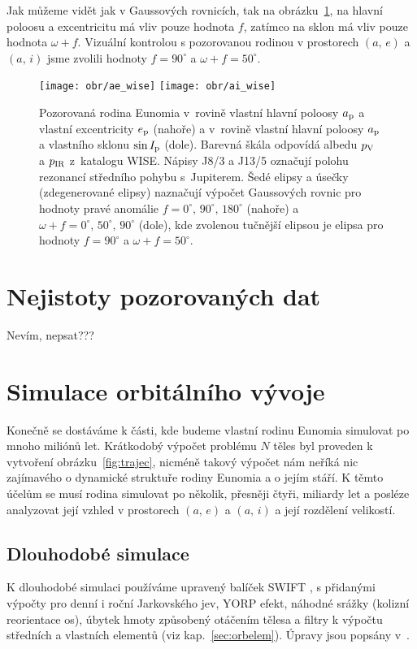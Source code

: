 \documentclass[A4paper, 12pt, oneside]{book}
\begin{document}
Jak můžeme vidět jak v Gaussových rovnicích, tak na obrázku~\ref{fig:ae_ai_wise}, na hlavní poloosu a excentricitu má vliv pouze hodnota $f$, zatímco na sklon má vliv pouze hodnota $\omega+f$. Vizuální kontrolou s pozorovanou rodinou v prostorech $(a,\,e)$ a $(a,\,i)$ jsme zvolili hodnoty $f=90^\circ$ a $\omega+f=50^\circ$.
\begin{figure}
	\centering
	\texttt{[image: obr/ae\_wise]}
	\texttt{[image: obr/ai\_wise]}
	\caption{Pozorovaná rodina Eunomia v~rovině vlastní hlavní poloosy $a_{\rm p}$ a vlastní excentricity $e_{\rm p}$ (nahoře) a v~rovině vlastní hlavní poloosy $a_{\rm p}$ a vlastního sklonu $\sin I_{\rm p}$ (dole). Barevná škála odpovídá albedu $p_{\rm V}$ a $p_{\rm IR}$ z~katalogu WISE\@. Nápisy J8/3 a J13/5 označují polohu rezonancí středního pohybu s~Jupiterem. Šedé elipsy a úsečky (zdegenerované elipsy) naznačují výpočet Gaussových rovnic pro hodnoty pravé anomálie $f=0^\circ,\,90^\circ,\,180^\circ$ (nahoře) a $\omega+f=0^\circ,\, 50^\circ,\, 90^\circ$ (dole), kde zvolenou tučnější elipsou je elipsa pro hodnoty $f=90^\circ$ a $\omega+f=50^\circ$.}
	\label{fig:ae_ai_wise}
\end{figure}
\section{Nejistoty pozorovaných dat}
Nevím, nepsat???

\pagebreak
\section{Simulace orbitálního vývoje}
Konečně se dostáváme k části, kde budeme vlastní rodinu Eunomia simulovat po mnoho miliónů let. Krátkodobý výpočet problému $N$ těles byl proveden k vytvoření obrázku~\ref{fig:trajec}, nicméně takový výpočet nám neříká nic zajímavého o dynamické struktuře rodiny Eunomia a o jejím stáří. K těmto účelům se musí rodina simulovat po několik, přesněji čtyři, miliardy let a posléze analyzovat její vzhled v prostorech $(a,\,e)$ a $(a,\,i)$ a její rozdělení velikostí.

\subsection{Dlouhodobé simulace}
K dlouhodobé simulaci používáme upravený balíček SWIFT \cite{levison94}, s přidanými výpočty pro denní i roční Jarkovského jev, YORP efekt, náhodné srážky (kolizní reorientace os), úbytek hmoty způsobený otáčením tělesa a filtry k výpočtu středních a vlastních elementů (viz kap.~\ref{sec:orbelem}). Úpravy jsou popsány v~\cite{broz11}.
\end{document}

